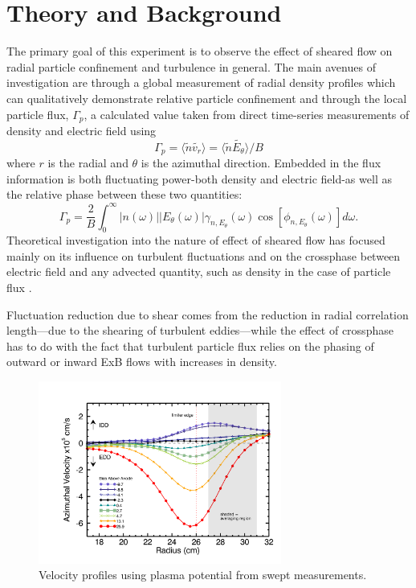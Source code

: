 \documentclass[%
 aip,
 amsmath,amssymb,
 preprint,%
]{revtex4-1}
\begin{document}
\section{Theory and Background}
The primary goal of this experiment is to observe the effect of sheared flow on radial particle confinement and turbulence in general. The main avenues of investigation are through a global measurement of radial density profiles which can qualitatively demonstrate relative particle confinement and through the local particle flux, $\Gamma_{p}$, a calculated value taken from direct time-series measurements of density and electric field using 
\begin{equation}
\Gamma_{p} = \langle \tilde{n} \tilde{v_{r}} \rangle = \langle \tilde{n} \tilde{E_{\theta}} \rangle /B
\label{eq:flux}
\end{equation}
where $r$ is the radial and $\theta$ is the azimuthal direction. Embedded in the flux information is both fluctuating power-both density and electric field-as well as the relative phase between these two quantities: 
\begin{equation}
\Gamma_{p} = \frac{2}{B} \int^{\infty}_{0} \lvert n(\omega) \rvert \lvert E_{\theta}(\omega) \rvert \gamma_{n,E_{\theta}}(\omega) \cos [\phi_{n,E_{\theta}}(\omega)] d\omega.
\label{eq:fluxint}
\end{equation}
Theoretical investigation into the nature of effect of sheared flow has focused mainly on its influence on turbulent fluctuations \cite{biglari90} and on the crossphase between electric field and any advected quantity, such as density in the case of particle flux \cite{ware96,terry01}.  

Fluctuation reduction due to shear comes from the reduction in radial correlation length---due to the shearing of turbulent eddies---while the effect of crossphase has to do with the fact that turbulent particle flux relies on the phasing of outward or inward ExB flows with increases in density.

\begin{figure}
\begin{center}
\includegraphics[width=8cm]{velocity.png}%
\end{center}
\caption{\label{fig:velocity} Velocity profiles using plasma potential from swept measurements.}
\end{figure}
\end{document}
